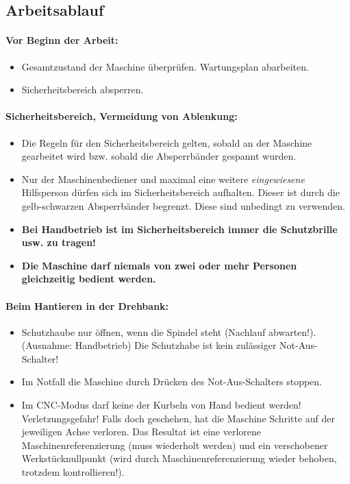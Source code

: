 \documentclass{\basedir/fablab-document}
\begin{document}
\subsection{Arbeitsablauf}
\paragraph{Vor Beginn der Arbeit:}
\begin{itemize}
\item Gesamtzustand der Maschine überprüfen. Wartungsplan abarbeiten.
\item Sicherheitsbereich absperren.
\end{itemize}

\paragraph{Sicherheitsbereich, Vermeidung von Ablenkung:}
\begin{itemize}
\item Die Regeln für den Sicherheitsbereich gelten, sobald an der Maschine gearbeitet wird bzw. sobald die Absperrbänder gespannt wurden.
\item Nur der Maschinenbediener und maximal eine weitere \emph{eingewiesene} Hilfsperson dürfen sich im Sicherheitsbereich aufhalten. Dieser ist durch die gelb-schwarzen Absperrbänder begrenzt. Diese sind unbedingt zu verwenden.
\item \textbf{Bei Handbetrieb ist im Sicherheitsbereich immer die Schutzbrille usw. zu tragen!}
\item \textbf{Die Maschine darf niemals von zwei oder mehr Personen gleichzeitig bedient werden.}
\end{itemize}

\paragraph{Beim Hantieren in der Drehbank:}
\begin{itemize}
 \item Schutzhaube nur öffnen, wenn die Spindel steht (Nachlauf abwarten!). (Ausnahme: Handbetrieb) Die Schutzhabe ist kein zulässiger Not-Aus-Schalter!
\item Im Notfall die Maschine durch Drücken des Not-Aus-Schalters stoppen.
\item Im CNC-Modus darf keine der Kurbeln von Hand bedient werden! Verletzungsgefahr! Falls doch geschehen, hat die Maschine Schritte auf der jeweiligen Achse verloren. Das Resultat ist eine verlorene Maschinenreferenzierung (muss wiederholt werden) und ein verschobener Werkstücknullpunkt (wird durch Maschinenreferenzierung wieder behoben, trotzdem kontrollieren!).
\end{itemize}
\end{document}
